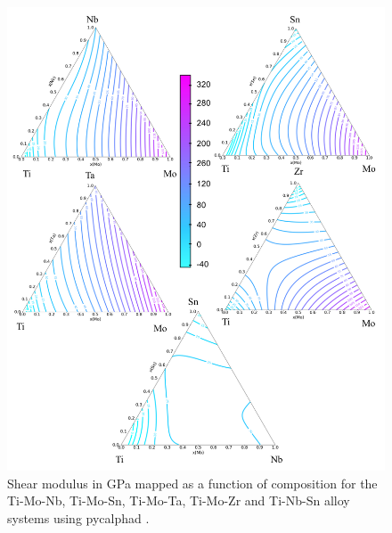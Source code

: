 \pagebreak
\begin{figure}[H]
	\centering
	\includegraphics[width=\textwidth]{Chapter-6/Figures/tixyshear1.png}
	\caption{Shear modulus in GPa mapped as a function of composition for the Ti-Mo-Nb, Ti-Mo-Sn, Ti-Mo-Ta, Ti-Mo-Zr and Ti-Nb-Sn alloy systems using pycalphad \cite{Otis2017}.}
	\label{Ch6-figure:tixyshear1}
\end{figure}

